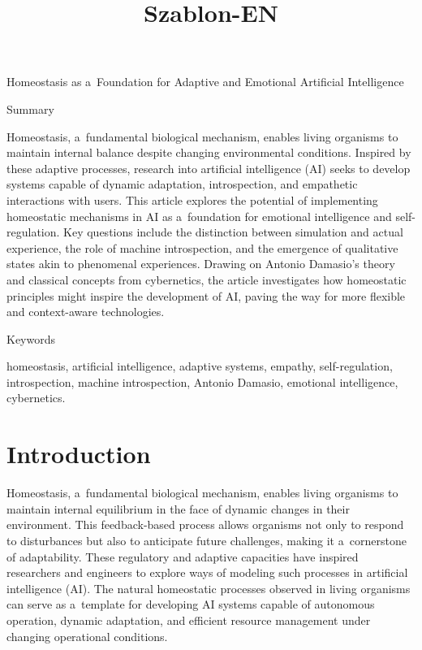 \setcounter{secnumdepth}{2}





\title{Szablon-EN}



Homeostasis as a~Foundation for Adaptive and Emotional Artificial Intelligence





Summary ~



Homeostasis, a~fundamental biological mechanism, enables living organisms to maintain internal balance despite changing environmental conditions. Inspired by these adaptive processes, research into artificial intelligence (AI) seeks to develop systems capable of dynamic adaptation, introspection, and empathetic interactions with users. This article explores the potential of implementing homeostatic mechanisms in AI as a~foundation for emotional intelligence and self-regulation. Key questions include the distinction between simulation and actual experience, the role of machine introspection, and the emergence of qualitative states akin to phenomenal experiences. Drawing on Antonio Damasio's theory and classical concepts from cybernetics, the article investigates how homeostatic principles might inspire the development of AI, paving the way for more flexible and context-aware technologies.~



Keywords



homeostasis, artificial intelligence, adaptive systems, empathy, self-regulation, introspection, machine introspection, Antonio Damasio, emotional intelligence, cybernetics.~



\section*{Introduction}

Homeostasis, a~fundamental biological mechanism, enables living organisms to maintain internal equilibrium in the face of dynamic changes in their environment. This feedback-based process allows organisms not only to respond to disturbances but also to anticipate future challenges, making it a~cornerstone of adaptability. These regulatory and adaptive capacities have inspired researchers and engineers to explore ways of modeling such processes in artificial intelligence (AI). The natural homeostatic processes observed in living organisms can serve as a~template for developing AI systems capable of autonomous operation, dynamic adaptation, and efficient resource management under changing operational conditions.



